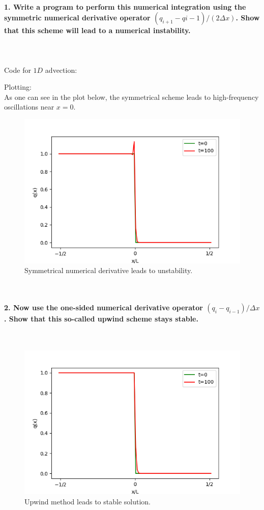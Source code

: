 \paragraph{1. Write a program to perform this numerical 
    integration using the symmetric numerical derivative 
    operator $(q_{i+1}-q{i-1})/(2\Delta x)$. Show that this 
    scheme will lead to a numerical instability.
} \ \\
    \\
    Code for $1D$ advection:
    
    \newpage\noindent
    Plotting:
     \ \\
    As one can see in the plot below, the 
    symmetrical scheme leads to high-frequency 
    oscillations near $x=0$.
    \begin{figure}[h!]
        \centering
        \includegraphics[width=.6\textwidth]{../figures/symmetric_1.png}
        \caption{Symmetrical numerical derivative leads to unstability.}
    \end{figure} \ \\ 

\newpage
\paragraph{2. Now use the one-sided numerical derivative 
    operator $(q_i-q_{i-1})/\Delta x$. Show that this 
    so-called upwind scheme stays stable.
} \ \\
    \begin{figure}[h!]
        \centering
        \includegraphics[width=.6\textwidth]{../figures/upwind_2.png}
        \caption{Upwind method leads to stable solution.}
    \end{figure} \ \\ 

